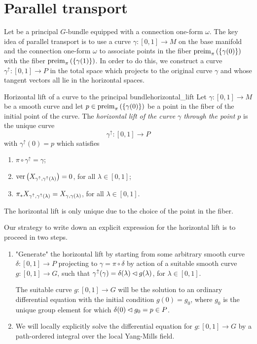 \section{Parallel transport}
Let  be a principal \(G\)-bundle equipped with a connection one-form \(\omega\). The key idea of parallel transport is to use a curve \(\gamma : [0,1]\to M\) on the base manifold and the connection one-form \(\omega\) to associate points in the fiber \(\operatorname{preim}_{\pi}{\left(\{\gamma(0)\}\right)}\)  with the fiber \(\operatorname{preim}_{\pi}{\left(\{\gamma(1)\}\right)}\). In order to do this, we construct a curve \(\gamma^\uparrow : [0,1] \to P\) in the total space which projects to the original curve \(\gamma\) and whose tangent vectors all lie in the horizontal spaces.

\begin{definition}{Horizontal lift of a curve to the principal bundle}{horizontal_lift}
    Let \(\gamma : [0,1] \to M\) be a smooth curve and let \(p \in \operatorname{preim}_{\pi}{\left(\{\gamma(0)\}\right)}\) be a point in the fiber of the initial point of the curve. The \emph{horizontal lift of the curve \(\gamma\) through the point \(p\)} is the unique curve
    \begin{equation*}
        \gamma^\uparrow : [0,1] \to P
    \end{equation*}
    with \(\gamma^\uparrow(0) = p\) which satisfies
    \begin{enumerate}[label=(\alph*)]
        \item \(\pi \circ \gamma^\uparrow = \gamma\);
        \item \(\operatorname{ver}\left(X_{\gamma^\uparrow, \gamma^\uparrow(\lambda)}\right) = 0\), for all \(\lambda \in [0,1]\);
        \item \({\pi}_{\ast{}}{X_{\gamma^\uparrow, \gamma^\uparrow(\lambda)}} = X_{\gamma, \gamma(\lambda)}\), for all \(\lambda \in [0,1]\).
    \end{enumerate}
\end{definition}
\begin{remark}
    The horizontal lift is only unique due to the choice of the point in the fiber.
\end{remark}

Our strategy to write down an explicit expression for the horizontal lift is to proceed in two steps.
\begin{enumerate}[label=(\alph*)]
    \item "Generate" the horizontal lift by starting from some arbitrary smooth curve \(\delta : [0,1] \to P\) projecting to \(\gamma = \pi \circ \delta\) by action of a suitable smooth curve \(g : [0,1] \to G\), such that \(\gamma^\uparrow(\gamma) = \delta(\lambda) \mathbin{\vartriangleleft} g(\lambda)\), for \(\lambda \in [0,1]\).

    The suitable curve \(g : [0,1] \to G\) will be the solution to an ordinary differential equation with the initial condition \(g(0) = g_0\), where \(g_0\) is the unique group element for which \(\delta(0) \mathbin{\vartriangleleft} g_0 = p \in P\).
    \item We will locally explicitly solve the differential equation for \(g : [0,1]\to G\) by a path-ordered integral over the local Yang-Mills field.
\end{enumerate}

